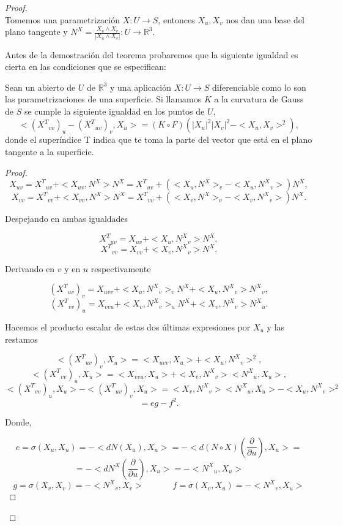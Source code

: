 \begin{proof}
	${ }$\\
	Tomemos una parametrización $X : U \to S$, entonces $X_u, X_v$ nos dan una base del plano tangente y $N^X = \frac{X_u \wedge X_v}{|X_u \wedge X_v|} : U \to \mathbb{R}^3$.
	
	Antes de la demostración del teorema probaremos que la siguiente igualdad es cierta en las condiciones que se especifican:
	\begin{lema}
		Sean un abierto de $U$ de $\mathbb{R}^3$ y una aplicación $X : U \to S$ diferenciable como lo son las parametrizaciones de una superficie. Si llamamos $K$ a la curvatura de Gauss de $S$ se cumple la siguiente igualdad en los puntos de $U$,
		\[
			<({X^T}_{vv})_u - ({X^T}_{uv})_v, X_u> = (K \circ F)(|X_u|^2|X_v|^2 - <X_u, X_v>^2),
		\]
		donde el superíndice T indica que te toma la parte del vector que está en el plano tangente a la superficie.
	\end{lema}
	\begin{proof}
		\[
			X_{uv} = {X^T}_{uv} + <X_{uv}, N^X>N^X = {X^T}_{uv} + (<X_u,N^X>_v - <X_u, {N^X}_v>)N^X,
		\]
		\[
			X_{vv} = {X^T}_{vv} + <X_{vv}, N^X>N^X = {X^T}_{vv} + (<X_v,N^X>_v - <X_v, {N^X}_v>)N^X.
		\]
		
		Despejando en ambas igualdades
		
		\[
			{X^T}_{uv} = X_{uv} + <X_u, {N^X}_v>N^X,
		\]
		\[
			{X^T}_{vv} = X_{vv} + <X_v, {N^X}_v>N^X.
		\]
		
		Derivando en $v$ y en $u$ respectivamente
		
		\[
			({X^T}_{uv})_v = X_{uvv} + <X_u, {N^X}_v>_v N^X + <X_u, {N^X}_v> {N^X}_v,
		\]
		\[
			({X^T}_{vv})_u = X_{vvu} + <X_v, {N^X}_v>_u N^X + <X_v, {N^X}_v>{N^X}_u.
		\]
		
		Hacemos el producto escalar de estas dos últimas expresiones por $X_u$ y las restamos
		
		\[
			<({X^T}_{uv})_v, X_u> = <X_{uvv}, X_u> + <X_u, {N^X}_v>^2,
		\]
		\[
			<({X^T}_{vv})_u, X_u> = <X_{vvu}, X_u> + <X_v, {N^X}_v><{N^X}_u, X_u>,
		\]
	${ }$\\	
		\[
			<({X^T}_{vv})_u, X_u> - <({X^T}_{uv})_v, X_u> = <X_v, {N^X}_v><{N^X}_u, X_u> - <X_u, {N^X}_v>^2
		\]
		\[
			= eg - f^2.
		\]
		
		Donde,
		
		\[
			e = \sigma(X_u, X_u) = - <dN(X_u), X_u> = - <d(N\circ X)(\frac{\partial}{\partial u} ), X_u> =
		\]
		\[
			= - <dN^X(\frac{\partial}{\partial u} ), X_u> = - <{N^X}_u, X_u>
		\]
	${ }$\\	
		\[
			g = \sigma (X_v, X_v) =  - <{N^X}_v, X_v> \;\;\;\;\;\;\;\;\;\;\;\; f = \sigma (X_v, X_u) =  - <{N^X}_v, X_u>
		\]
		

\end{proof}
\end{proof}
